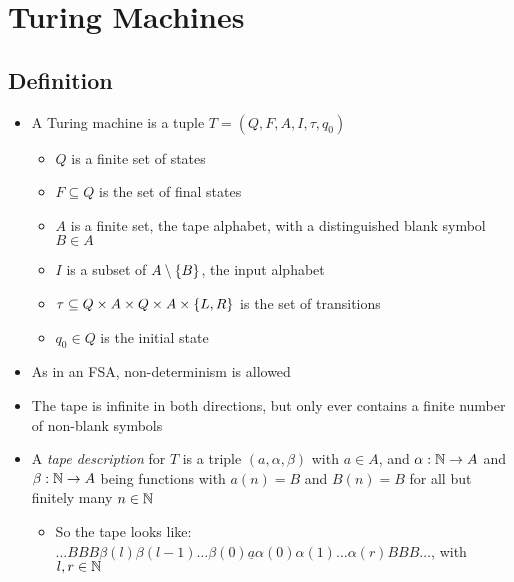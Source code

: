 \section{Turing Machines}

\subsection{Definition}

\begin{itemize}
	
	\item A Turing machine is a tuple $ T = (Q, F, A, I, \tau, q_0) $
	
	\begin{itemize}
		
		\item $ Q $ is a finite set of states
		
		\item $ F \subseteq Q $ is the set of final states
		
		\item $ A $ is a finite set, the tape alphabet, with a distinguished blank symbol $ B \in A $
		
		\item $ I $ is a subset of $ A \setminus \left\lbrace B \right\rbrace $, the input alphabet
		
		\item $ \tau \subseteq Q \times A \times Q \times A \times \left\lbrace L, R \right\rbrace $ is the set of transitions
		
		\item $ q_0 \in Q $ is the initial state
				
	\end{itemize}
	
	\item As in an FSA, non-determinism is allowed
	
	\item The tape is infinite in both directions, but only ever contains a finite number of non-blank symbols
	
	\item A \textit{tape description} for $ T $ is a triple $ (a, \alpha, \beta) $ with $ a \in A $, and $ \alpha: \mathbb{N} \to A $ and $ \beta: \mathbb{N} \to A $ being functions with $ a(n) = B $ and $ B(n) = B $ for all but finitely many $ n \in \mathbb{N} $
	
	\begin{itemize}
		\item So the tape looks like: $ \dots BBB \beta(l) \beta(l - 1) \dots \beta(0) \underline{a} \alpha(0) \alpha(1) \dots \alpha(r) BBB \dots $, with $ l, r \in \mathbb{N} $
	\end{itemize}
	

\end{itemize}
